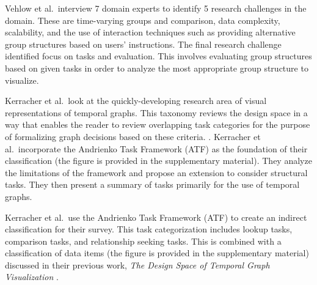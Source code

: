 Vehlow et al.\ interview 7 domain experts to identify 5 research challenges in the domain. These are time-varying groups and comparison, data complexity, scalability, and the use of interaction techniques such as providing alternative group structures based on users' instructions. The final research challenge identified focus on tasks and evaluation. This involves evaluating group structures based on given tasks in order to analyze the most appropriate group structure to visualize.

Kerracher et al.\ look at the quickly-developing research area of visual representations of temporal graphs. This taxonomy reviews the design space  in a way that enables the reader to review overlapping task categories for the purpose of formalizing graph decisions based on these criteria. \cite{kerracher2015task, kerracher2015visual}.
Kerracher et al.\ incorporate the Andrienko Task Framework (ATF) \cite{andrienko2006exploratory}  as the foundation of their classification (the figure is provided in the supplementary material). They analyze the limitations of the framework and propose an extension to consider structural tasks. They then present a summary of tasks primarily for the use of temporal graphs.


Kerracher et al.\ use the Andrienko Task Framework (ATF) \cite{andrienko2006exploratory} to create an indirect classification for their survey. This  task categorization includes lookup tasks, comparison tasks, and relationship seeking tasks. This is combined with a classification of data items (the figure is provided in the supplementary material) discussed in their previous work, \textit{The Design Space of Temporal Graph Visualization} \cite{kerracher2014design}.


